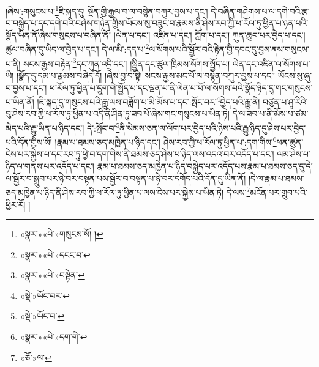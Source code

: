 །ཞེས་:གསུངས་པ་\footnote{«སྣར་»«པེ་»གསུངས་སོ། །}ཇི་སྐད་དུ། སྔོན་གྱི་རྒྱལ་བ་ལ་བསྙེན་བཀུར་བྱས་པ་དང་། དེ་བཞིན་གཤེགས་པ་ལ་དགེ་བའི་རྩ་བ་བསྐྱེད་པ་དང་དགེ་བའི་བཤེས་གཉེན་གྱིས་ཡོངས་སུ་བཟུང་བ་རྣམས་ནི་ཤེས་རབ་ཀྱི་ཕ་རོལ་ཏུ་ཕྱིན་པ་ཉན་པའི་སྣོད་ཡིན་ནོ་ཞེས་གསུངས་པ་བཞིན་ནོ། །ལེན་པ་དང་། འཛིན་པ་དང་། ཀློག་པ་དང་། ཀུན་ཆུབ་པར་བྱེད་པ་དང་། ཚུལ་བཞིན་དུ་ཡིད་ལ་བྱེད་པ་དང་། དེ་ལ་མི་:དད་པ་\footnote{«སྣར་»«པེ་»དངང་བ་}ལ་སོགས་པའི་སྦྱོར་བའི་རྟེན་གྱི་དབང་དུ་བྱས་ནས་གསུངས་པ་ནི། སངས་རྒྱས་བརྟེན་\footnote{«སྣར་»«པེ་»བསྟེན་}དང་ཀུན་འདྲི་དང་། །སྦྱིན་དང་ཚུལ་ཁྲིམས་སོགས་སྤྱོད་པ། ལེན་དང་འཛིན་ལ་སོགས་པ་ཡི། །སྣོད་དུ་དམ་པ་རྣམས་བཞེད་དོ། །ཞེས་བྱ་བ་སྟེ། སངས་རྒྱས་མང་པོ་ལ་བསྙེན་བཀུར་བྱས་པ་དང་། ཡོངས་སུ་ཞུ་བ་བྱས་པ་དང་། ཕ་རོལ་ཏུ་ཕྱིན་པ་དྲུག་གི་སྤྱོད་པ་དང་ལྡན་པ་ནི་ལེན་པ་པོ་ལ་སོགས་པའི་སྣོད་ཉིད་དུ་གང་གསུངས་པ་ཡིན་ནོ། །ཇི་སྐད་དུ་གསུངས་པའི་རྒྱུ་ལས་བཟློག་པ་མི་མོས་པ་དང་:སྤོང་བར་\footnote{«སྡེ་»ཡོང་བར་}བྱེད་པའི་རྒྱུ་ནི། བཙུན་པ་ཤཱ་རིའི་བུ་ཤེས་རབ་ཀྱི་ཕ་རོལ་ཏུ་ཕྱིན་པ་འདི་ནི་ཤིན་ཏུ་ཟབ་པོ་ཞེས་གང་གསུངས་པ་ཡིན་ཏེ། དེ་ལ་ཟབ་པ་ནི་མོས་པ་ཙམ་མེད་པའི་རྒྱུ་ཡིན་པ་ཉིད་དང་། དེ་:སྤོང་བ་\footnote{«སྡེ་»ཡོང་བ་}ནི་སེམས་ཅན་ལ་ལོག་པར་བྱེད་པའི་ཉེས་པའི་རྒྱུ་ཉིད་དུ་ཤེས་པར་བྱེད་པའི་དོན་གྱིས་སོ། །རྣམ་པ་ཐམས་ཅད་མཁྱེན་པ་ཉིད་དང་། ཤེས་རབ་ཀྱི་ཕ་རོལ་ཏུ་ཕྱིན་པ་:དག་གིས་\footnote{«སྣར་»«པེ་»དག་གི་}ཕན་ཚུན་ངེས་པར་སྐྱེས་པ་དང་རབ་ཏུ་ཕྱེ་བ་དག་གིས་ནི་ཐམས་ཅད་ཤེས་པ་ཉིད་ལས་འདའ་བར་འདོད་པ་དང་། ལམ་ཤེས་པ་ཉིད་ལ་གནས་པར་འདོད་པ་དང་། རྣམ་པ་ཐམས་ཅད་མཁྱེན་པ་ཉིད་བསྐྱེད་པར་འདོད་པས་རྣམ་པ་ཐམས་ཅད་དུ་དེ་ལ་སྦྱོར་བ་སྒྲུབ་པར་ཉེ་བར་བསྟན་པས་སྦྱོར་བ་བསྟན་པ་ཉེ་བར་དགོད་པའི་དོན་དུ་ཡིན་ནོ། །དེ་ལ་རྣམ་པ་ཐམས་ཅད་མཁྱེན་པ་ཉིད་ནི་ཤེས་རབ་ཀྱི་ཕ་རོལ་ཏུ་ཕྱིན་པ་ལས་ངེས་པར་སྐྱེས་པ་ཡིན་ཏེ། དེ་ལས་\footnote{«ཅོ་»ལ་}མངོན་པར་གྲུབ་པའི་ཕྱིར་རོ། །
